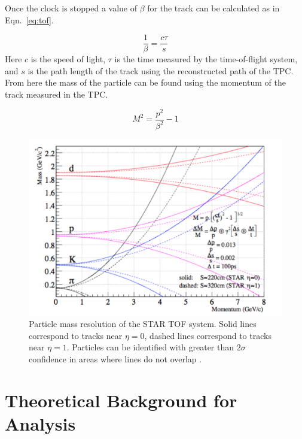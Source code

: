 \documentclass[letterpaper, abstract = on,listof=totoc, bibliography=totoc]{scrreprt}
\begin{document}
Once the clock is stopped a value of $\beta$ for the track can be calculated as in Eqn.~\ref{eq:tof}. 

\begin{equation}
\label{eq:tof}
\frac{1}{\beta} = \frac{c\tau}{s}
\end{equation}
%
Here $c$ is the speed of light, $\tau$ is the time measured by the time-of-flight system, and $s$ is the path length of the track using the reconstructed path of the TPC. From here the mass of the particle can be found using the momentum of the track measured in the TPC.

\begin{equation}
\label{eq:mtof}
M^2 = \frac{p^2}{\beta^2} - 1
\end{equation}

\begin{figure}
\begin{center}
\includegraphics[width = 1\textwidth]{TOFpid}
\caption[Particle identification with TOF]{Particle mass resolution of the STAR TOF system. Solid lines correspond to tracks near $\eta=0$, dashed lines correspond to tracks near $\eta=1$. Particles can be identified with greater than $2\sigma$ confidence in areas where lines do not overlap \cite{largeAreaTOF}.}
\label{fig:tofPID}
\end{center}
\end{figure}




\chapter{Theoretical Background for Analysis}
\label{ch:theory}
\end{document}
